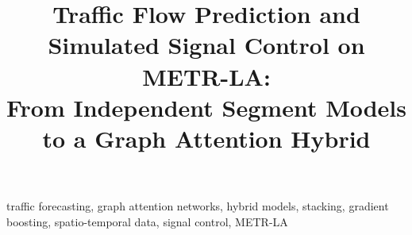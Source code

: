 \documentclass[conference]{IEEEtran}
\begin{document}
\title{Traffic Flow Prediction and Simulated Signal Control on METR-LA:\\
From Independent Segment Models to a Graph Attention Hybrid}

\author{}

\maketitle

\begin{abstract}

\end{abstract}

\begin{IEEEkeywords}
traffic forecasting, graph attention networks, hybrid models, stacking,
gradient boosting, spatio-temporal data, signal control, METR-LA
\end{IEEEkeywords}














\end{document}
